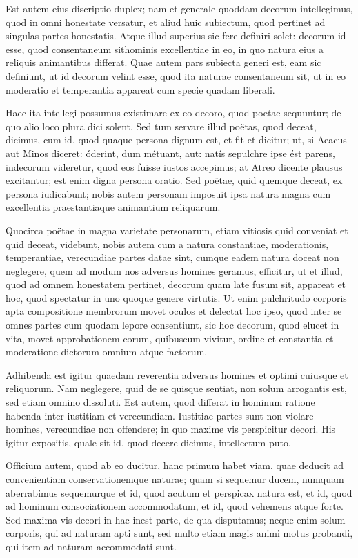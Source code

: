  Est autem eius discriptio duplex; nam et generale quoddam decorum intellegimus, quod in omni honestate versatur, et aliud huic subiectum, quod pertinet ad singulas partes honestatis. Atque illud superius sic fere definiri solet: decorum id esse, quod consentaneum sithominis excellentiae in eo, in quo natura eius a reliquis animantibus differat. Quae autem pars subiecta generi est, eam sic definiunt, ut id decorum velint esse, quod ita naturae consentaneum sit, ut in eo moderatio et temperantia appareat cum specie quadam liberali.

 Haec ita intellegi possumus existimare ex eo decoro, quod poetae sequuntur; de quo alio loco plura dici solent. Sed tum servare illud poëtas, quod deceat, dicimus, cum id, quod quaque persona dignum est, et fit et dicitur; ut, si Aeacus aut Minos diceret: óderint, dum métuant, aut: natís sepulchre ipse ést parens, indecorum videretur, quod eos fuisse iustos accepimus; at Atreo dicente plausus excitantur; est enim digna persona oratio. Sed poëtae, quid quemque deceat, ex persona iudicabunt; nobis autem personam imposuit ipsa natura magna cum excellentia praestantiaque animantium reliquarum.

 Quocirca poëtae in magna varietate personarum, etiam vitiosis quid conveniat et quid deceat, videbunt, nobis autem cum a natura constantiae, moderationis, temperantiae, verecundiae partes datae sint, cumque eadem natura doceat non neglegere, quem ad modum nos adversus homines geramus, efficitur, ut et illud, quod ad omnem honestatem pertinet, decorum quam late fusum sit, appareat et hoc, quod spectatur in uno quoque genere virtutis. Ut enim pulchritudo corporis apta compositione membrorum movet oculos et delectat hoc ipso, quod inter se omnes partes cum quodam lepore consentiunt, sic hoc decorum, quod elucet in vita, movet approbationem eorum, quibuscum vivitur, ordine et constantia et moderatione dictorum omnium atque factorum.

 Adhibenda est igitur quaedam reverentia adversus homines et optimi cuiusque et reliquorum. Nam neglegere, quid de se quisque sentiat, non solum arrogantis est, sed etiam omnino dissoluti. Est autem, quod differat in hominum ratione habenda inter iustitiam et verecundiam. Iustitiae partes sunt non violare homines, verecundiae non offendere; in quo maxime vis perspicitur decori. His igitur expositis, quale sit id, quod decere dicimus, intellectum puto.

 Officium autem, quod ab eo ducitur, hanc primum habet viam, quae deducit ad convenientiam conservationemque naturae; quam si sequemur ducem, numquam aberrabimus sequemurque et id, quod acutum et perspicax natura est, et id, quod ad hominum consociationem accommodatum, et id, quod vehemens atque forte. Sed maxima vis decori in hac inest parte, de qua disputamus; neque enim solum corporis, qui ad naturam apti sunt, sed multo etiam magis animi motus probandi, qui item ad naturam accommodati sunt.

